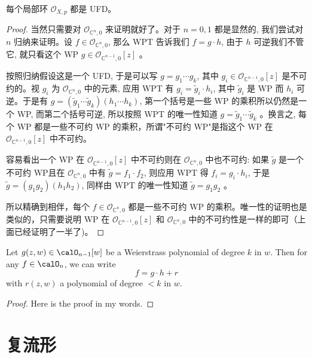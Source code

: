 \documentclass[lang=cn,12pt,fontset=none,a4paper]{beautybook}
\begin{document}
\begin{corollary}
   每个局部环 $\mathcal{O}_{X, p}$ 都是 UFD。
\end{corollary}
\begin{proof}
当然只需要对 $\mathcal{O}_{\mathbb{C}^n, 0}$ 来证明就好了。对于 $n=0,1$ 都是显然的, 我们尝试对 $n$ 归纳来证明。设 $f \in \mathcal{O}_{\mathbb{C}^n, 0}$, 那么 WPT 告诉我们 $f=g \cdot h$, 由于 $h$ 可逆我们不管它, 就只看这个 WP $g \in \mathcal{O}_{\mathbb{C}^{n-1}, 0}[z]$ 。

按照归纳假设这是一个 UFD, 于是可以写 $g=g_1 \cdots g_k$, 其中 $g_i \in \mathcal{O}_{\mathbb{C}^{n-1}, 0}[z]$ 是不可约的。视 $g_i$ 为 $\mathcal{O}_{\mathbb{C}^n, 0}$ 中的元素, 应用 WPT 有 $g_i=\tilde{g}_i \cdot h_i$, 其中 $\tilde{g}_i$ 是 WP 而 $h_i$ 可逆。于是有 $g=\left(\tilde{g}_1 \cdots \tilde{g}_k\right)\left(h_1 \cdots h_k\right)$, 第一个括号是一些 WP 的乘积所以仍然是一个 WP, 而第二个括号可逆, 所以按照 WPT 的唯一性知道 $g=\tilde{g}_1 \cdots \tilde{g}_k$ 。换言之, 每个 WP 都是一些不可约 WP 的乘积，所谓"不可约 WP"是指这个 WP 在 $\mathcal{O}_{\mathbb{C}^{n-1}, 0}[z]$ 中不可约。

容易看出一个 WP 在 $\mathcal{O}_{\mathbb{C}^{n-1}, 0}[z]$ 中不可约则在 $\mathcal{O}_{\mathbb{C}^n, 0}$ 中也不可约: 如果 $\tilde{g}$ 是一个不可约 WP且在 $\mathcal{O}_{\mathbb{C}^n, 0}$ 中有 $\tilde{g}=f_1 \cdot f_2$, 则应用 WPT 得 $f_i=g_i \cdot h_i$, 于是 $\tilde{g}=\left(g_1 g_2\right)\left(h_1 h_2\right)$, 同样由 WPT 的唯一性知道 $\tilde{g}=g_1 g_2$ 。

所以精确到相伴，每个 $f \in \mathcal{O}_{\mathbb{C}^n, 0}$ 都是一些不可约 WP 的乘积。唯一性的证明也是类似的，只需要说明 WP 在 $\mathcal{O}_{\mathbb{C}^{n-1}, 0}[z]$ 和 $\mathcal{O}_{\mathbb{C}^n, 0}$ 中的不可约性是一样的即可（上面已经证明了一半了)。
\end{proof}

      

\begin{theorem}
   Let $g(z,w)\in \calO_{n-1}[w]$ be a Weierstrass polynomial of degree $k$ in $w$. Then for any $f\in \calO_{n}$, we can write 
   \[f=g\cdot h+r\]
   with $r(z,w)$ a polynomial of degree $<k$ in $w$.
\end{theorem}
   \begin{proof}
      Here is the proof in my words. 
      
   \end{proof}

\section{复流形}
\end{document}
